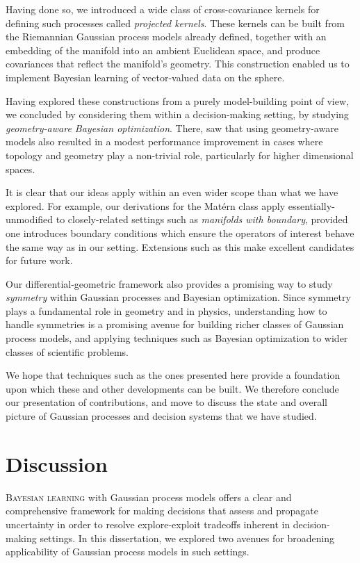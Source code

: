 \documentclass[11pt]{book}
\begin{document}
Having done so, we introduced a wide class of cross-covariance kernels for defining such processes called \emph{projected kernels}.
These kernels can be built from the Riemannian Gaussian process models already defined, together with an embedding of the manifold into an ambient Euclidean space, and produce covariances that reflect the manifold's geometry.
This construction enabled us to implement Bayesian learning of vector-valued data on the sphere.

Having explored these constructions from a purely model-building point of view, we concluded by considering them within a decision-making setting, by studying \emph{geometry-aware Bayesian optimization}.
There, saw that using geometry-aware models also resulted in a modest performance improvement in cases where topology and geometry play a non-trivial role, particularly for higher dimensional spaces.

It is clear that our ideas apply within an even wider scope than what we have explored.
For example, our derivations for the Matérn class apply essentially-unmodified to closely-related settings such as \emph{manifolds with boundary}, provided one introduces boundary conditions which ensure the operators of interest behave the same way as in our setting.
Extensions such as this make excellent candidates for future work.

Our differential-geometric framework also provides a promising way to study \emph{symmetry} within Gaussian processes and Bayesian optimization.
Since symmetry plays a fundamental role in geometry and in physics, understanding how to handle symmetries is a promising avenue for building richer classes of Gaussian process models, and applying techniques such as Bayesian optimization to wider classes of scientific problems.

We hope that techniques such as the ones presented here provide a foundation upon which these and other developments can be built.
We therefore conclude our presentation of contributions, and move to discuss the state and overall picture of Gaussian processes and decision systems that we have studied.





\chapter{Discussion}
\label{ch:discussion}

\lettrine{B}{ayesian learning} with Gaussian process models offers a clear and comprehensive framework for making decisions that assess and propagate uncertainty in order to resolve explore-exploit tradeoffs inherent in decision-making settings.
In this dissertation, we explored two avenues for broadening applicability of Gaussian process models in such settings.
\end{document}
